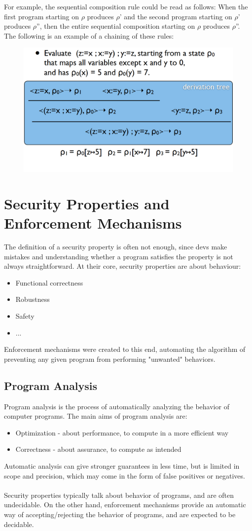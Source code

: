 \documentclass[10pt,a4paper]{report}
\begin{document}
For example, the sequential composition rule could be read as follows: When the first program starting on $\rho$ produces $\rho$' and the second program starting on $\rho$' produces $\rho$'', then  the entire sequential
composition starting on $\rho$ produces $\rho$''. The following is an example of a chaining of these rules:
\begin{figure}[H]
\centering
\includegraphics[scale=0.4]{6.png}
\end{figure}
\section{Security Properties and Enforcement Mechanisms}
The definition of a security property is often not enough, since devs make mistakes and understanding whether a program satisfies the property is not always straightforward. At their core, security properties are about behaviour:
\begin{itemize}
\item Functional correctness
\item Robustness
\item Safety
\item ...
\end{itemize}
Enforcement mechanisms were created to this end, automating the algorithm of preventing any given program from performing "unwanted" behaviors.
\subsection{Program Analysis}
Program analysis is the process of automatically analyzing the behavior of computer programs. The main aims of program analysis are:
\begin{itemize}
\item Optimization - about performance, to compute in a more efficient way
\item Correctness - about assurance, to compute as intended
\end{itemize}
Automatic analysis can give stronger guarantees in less time, but is limited in scope and precision, which may come in the form of false positives or negatives.\\
\\
Security properties typically talk about behavior of programs, and are often undecidable. On the other hand, enforcement mechanisms provide an automatic way of accepting/rejecting the behavior of programs, and are expected to be decidable.
\end{document}
